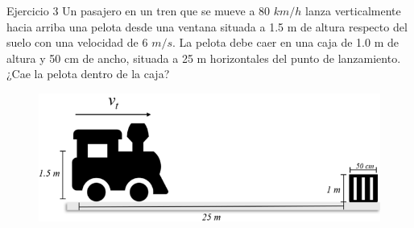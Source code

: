 \begin{frame}{Ejercicio 3}
 Un pasajero en un 
tren que se mueve a 80 
$\unit{km}/\unit{h}$ lanza verticalmente 
hacia arriba una pelota 
desde una ventana 
situada a 1.5 m de altura 
respecto del suelo con 
una velocidad de 6 $\unit{m}/\unit{s}$. 
La pelota debe caer en 
una caja de 1.0 m de altura y 50 cm de ancho, situada a 25 m horizontales del punto de 
lanzamiento. ¿Cae la pelota dentro de la caja?

\begin{figure}
    \centering
    \includegraphics[width=0.8\linewidth]{figures/tren-caja.png}
\end{figure}
   
\end{frame}

